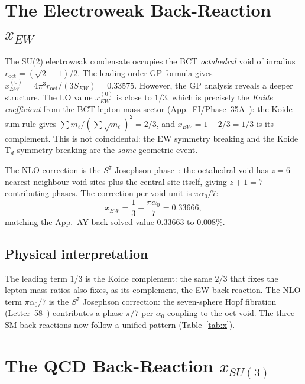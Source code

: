 \documentclass[aps,prl,twocolumn,showpacs,preprintnumbers]{revtex4-2}
\newcommand{\roct}{r_{\mathrm{oct}}}
\newcommand{\azero}{\alpha_0}
\begin{document}
\section{The Electroweak Back-Reaction $x_{EW}$}

The SU(2) electroweak condensate occupies the BCT
\emph{octahedral} void of inradius $\roct = (\sqrt{2}-1)/2$.
The leading-order GP formula gives $x_{EW}^{(0)} = 4\pi^3\roct/(3S_{EW}) = 0.33575$.
However, the GP analysis reveals a deeper structure. The LO value $x_{EW}^{(0)}$
is close to $1/3$, which is precisely the \emph{Koide coefficient}
from the BCT lepton mass sector (App.~FI/Phase~35A~\cite{appFI}): the Koide
sum rule gives $\sum m_\ell/(\sum\sqrt{m_\ell})^2 = 2/3$, and
$x_{EW} = 1 - 2/3 = 1/3$ is its complement.
This is not coincidental: the EW symmetry breaking and the Koide T$_d$
symmetry breaking are the \emph{same} geometric event.

The NLO correction is the $S^7$ Josephson phase~\cite{letter58}:
the octahedral void has $z=6$ nearest-neighbour void sites plus
the central site itself, giving $z+1=7$ contributing phases.
The correction per void unit is $\pi\azero/7$:
\begin{equation}
  \boxed{x_{EW} = \frac{1}{3} + \frac{\pi\azero}{7} = 0.33666,}
  \label{eq:xEW}
\end{equation}
matching the App.~AY back-solved value $0.33663$ to $\mathbf{0.008\%}$.

\subsection*{Physical interpretation}
The leading term $1/3$ is the Koide complement: the same $2/3$ that
fixes the lepton mass ratios also fixes, as its complement, the EW
back-reaction. The NLO term $\pi\azero/7$ is the $S^7$ Josephson
correction: the seven-sphere Hopf fibration (Letter~58~\cite{letter58})
contributes a phase $\pi/7$ per $\azero$-coupling to the oct-void.
The three SM back-reactions now follow a unified pattern (Table~\ref{tab:x}).

\section{The QCD Back-Reaction $x_{SU(3)}$}
\end{document}
